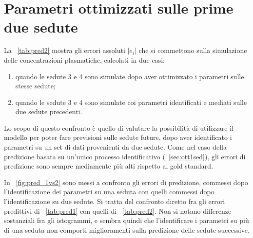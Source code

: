 \section{Parametri ottimizzati sulle prime due sedute}
La \tablename~\ref{tab:pred2} mostra gli errori assoluti $|e_i|$ che si commettono sulla simulazione delle concentrazioni plasmatiche, calcolati in due casi:
\begin{enumerate}
	\item quando le sedute 3 e 4 sono simulate dopo aver ottimizzato i parametri sulle stesse sedute;
	\item quando le sedute 3 e 4 sono simulate coi parametri identificati e mediati sulle due sedute precedenti.
\end{enumerate}
Lo scopo di questo confronto è quello di valutare la possibilità di utilizzare il modello per poter fare previsioni sulle sedute future, dopo aver identificato i parametri su un set di dati provenienti da due sedute. Come nel caso della predizione basata su un'unico processo identificativo (\textsection~\ref{sec:ott1sed}), gli errori di predizione sono sempre mediamente più alti rispetto al gold standard.

In \figurename~\ref{fig:pred_1vs2} sono messi a confronto gli errori di predizione, commessi dopo l'identificazione dei parametri su una seduta con quelli commessi dopo l'identificazione su due sedute. Si tratta del confronto diretto fra gli errori predittivi di \tablename~\ref{tab:pred1} con quelli di \tablename~\ref{tab:pred2}. Non si notano differenze sostanziali fra gli istogrammi, e sembra quindi che l'identificare i parametri su più di una seduta non comporti miglioramenti sulla predizione delle sedute successive.

